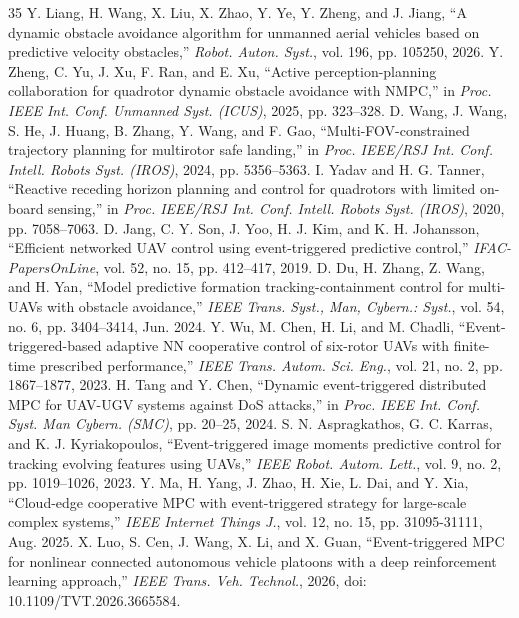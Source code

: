 \documentclass[lettersize,journal]{IEEEtran}
\begin{document}
\begin{thebibliography}{35}
	 Y. Liang, H. Wang, X. Liu, X. Zhao, Y. Ye, Y. Zheng, and J. Jiang, ``A dynamic obstacle avoidance algorithm for unmanned aerial vehicles based on predictive velocity obstacles,'' \textit{Robot. Auton. Syst.}, vol. 196, pp. 105250, 2026.
	 Y. Zheng, C. Yu, J. Xu, F. Ran, and E. Xu, ``Active perception-planning collaboration for quadrotor dynamic obstacle avoidance with NMPC,'' in \textit{Proc. IEEE Int. Conf. Unmanned Syst. (ICUS)}, 2025, pp. 323--328.
	 D. Wang, J. Wang, S. He, J. Huang, B. Zhang, Y. Wang, and F. Gao, ``Multi-FOV-constrained trajectory planning for multirotor safe landing,'' in \textit{Proc. IEEE/RSJ Int. Conf. Intell. Robots Syst. (IROS)}, 2024, pp. 5356--5363.
	 I. Yadav and H. G. Tanner, ``Reactive receding horizon planning and control for quadrotors with limited on-board sensing,'' in \textit{Proc. IEEE/RSJ Int. Conf. Intell. Robots Syst. (IROS)}, 2020, pp. 7058--7063.
	 D. Jang, C. Y. Son, J. Yoo, H. J. Kim, and K. H. Johansson, ``Efficient networked UAV control using event-triggered predictive control,'' \textit{IFAC-PapersOnLine}, vol. 52, no. 15, pp. 412--417, 2019.
	 D. Du, H. Zhang, Z. Wang, and H. Yan, ``Model predictive formation tracking-containment control for multi-UAVs with obstacle avoidance,'' \textit{IEEE Trans. Syst., Man, Cybern.: Syst.}, vol. 54, no. 6, pp. 3404--3414, Jun. 2024.
	 Y. Wu, M. Chen, H. Li, and M. Chadli, ``Event-triggered-based adaptive NN cooperative control of six-rotor UAVs with finite-time prescribed performance,'' \textit{IEEE Trans. Autom. Sci. Eng.}, vol. 21, no. 2, pp. 1867--1877, 2023.
	 H. Tang and Y. Chen, ``Dynamic event-triggered distributed MPC for UAV-UGV systems against DoS attacks,'' in \textit{Proc. IEEE Int. Conf. Syst. Man Cybern. (SMC)}, pp. 20--25, 2024.
	 S. N. Aspragkathos, G. C. Karras, and K. J. Kyriakopoulos, ``Event-triggered image moments predictive control for tracking evolving features using UAVs,'' \textit{IEEE Robot. Autom. Lett.}, vol. 9, no. 2, pp. 1019--1026, 2023.
	 Y. Ma, H. Yang, J. Zhao, H. Xie, L. Dai, and Y. Xia, ``Cloud-edge cooperative MPC with event-triggered strategy for large-scale complex systems,'' \textit{IEEE Internet Things J.}, vol. 12, no. 15, pp. 31095-31111, Aug. 2025.
	 X. Luo, S. Cen, J. Wang, X. Li, and X. Guan, ``Event-triggered MPC for nonlinear connected autonomous vehicle platoons with a deep reinforcement learning approach,'' \textit{IEEE Trans. Veh. Technol.}, 2026, doi: 10.1109/TVT.2026.3665584. 

\end{thebibliography}
\end{document}
